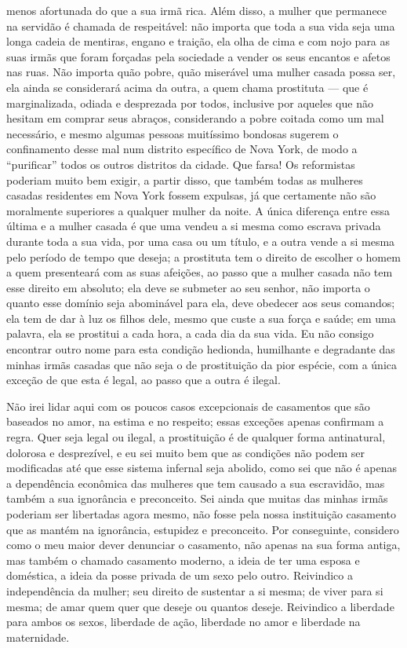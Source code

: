 menos afortunada do que a sua irmã rica. Além disso, a mulher que
permanece na servidão é chamada de respeitável: não importa que toda a
sua vida seja uma longa cadeia de mentiras, engano e traição, ela olha
de cima e com nojo para as suas irmãs que foram forçadas pela sociedade
a vender os seus encantos e afetos nas ruas. Não importa quão pobre,
quão miserável uma mulher casada possa ser, ela ainda se considerará
acima da outra, a quem chama prostituta --- que é marginalizada, odiada e
desprezada por todos, inclusive por aqueles que não hesitam em comprar
seus abraços, considerando a pobre coitada como um mal necessário, e
mesmo algumas pessoas muitíssimo bondosas sugerem o confinamento desse
mal num distrito específico de Nova York, de modo a ``purificar'' todos
os outros distritos da cidade. Que farsa! Os reformistas poderiam muito
bem exigir, a partir disso, que também todas as mulheres casadas
residentes em Nova York fossem expulsas, já que certamente não são
moralmente superiores a qualquer mulher da noite. A única diferença
entre essa última e a mulher casada é que uma vendeu a si mesma como
escrava privada durante toda a sua vida, por uma casa ou um título, e a
outra vende a si mesma pelo período de tempo que deseja; a prostituta tem o
direito de escolher o homem a quem presenteará com as suas afeições, ao
passo que a mulher casada não tem esse direito em absoluto; ela deve se
submeter ao seu senhor, não importa o quanto esse domínio seja
abominável para ela, deve obedecer aos seus comandos; ela tem de
dar à luz os filhos dele, mesmo que custe a sua força e saúde; em uma palavra,
ela se prostitui a cada hora, a cada dia da sua vida. Eu não
consigo encontrar outro nome para esta condição hedionda, humilhante e
degradante das minhas irmãs casadas que não seja o de prostituição da pior
espécie, com a única exceção de que esta é legal, ao passo que a outra é ilegal.

Não irei lidar aqui com os poucos casos excepcionais de casamentos que
são baseados no amor, na estima e no respeito; essas exceções apenas
confirmam a regra. Quer seja legal ou ilegal, a prostituição é de
qualquer forma antinatural, dolorosa e desprezível, e eu sei muito bem
que as condições não podem ser modificadas até que esse sistema infernal
seja abolido, como sei que não é apenas a dependência econômica das
mulheres que tem causado a sua escravidão, mas também a sua ignorância e
preconceito. Sei ainda que muitas das minhas irmãs poderiam ser
libertadas agora mesmo, não fosse pela nossa instituição casamento que
as mantém na ignorância, estupidez e preconceito. Por conseguinte,
considero como o meu maior dever denunciar o casamento, não apenas na
sua forma antiga, mas também o chamado casamento moderno, a ideia de ter
uma esposa e doméstica, a ideia da posse privada de um sexo pelo outro.
Reivindico a independência da mulher; seu direito de sustentar a si
mesma; de viver para si mesma; de amar quem quer que deseje ou quantos
deseje. Reivindico a liberdade para ambos os sexos, liberdade de ação,
liberdade no amor e liberdade na maternidade.

